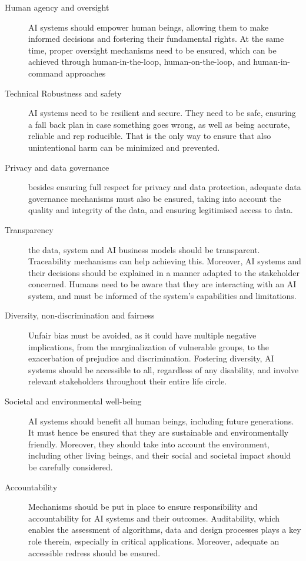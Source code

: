\begin{description}
    \item[Human agency and oversight] AI systems should empower human beings, allowing them to make informed decisions and fostering their fundamental rights. At the same time, proper oversight mechanisms need to be ensured, which can be achieved through human-in-the-loop, human-on-the-loop, and human-in-command approaches
    \item[Technical Robustness and safety] AI systems need to be resilient and secure. They need to be safe, ensuring a fall back plan in case something goes wrong, as well as being accurate, reliable and rep roducible. That is the only way to ensure that also unintentional harm can be minimized and prevented.
    \item[Privacy and data governance] besides ensuring full respect for privacy and data protection, adequate data governance mechanisms must also be ensured, taking into account the quality and integrity of the data, and ensuring legitimised access to data.
    \item[Transparency] the data, system and AI business models should be transparent. Traceability mechanisms can help achieving this. Moreover, AI systems and their decisions should be explained in a manner adapted to the stakeholder concerned. Humans need to be aware that they are interacting with an AI system, and must be informed of the system’s capabilities and limitations.
    \item[Diversity, non-discrimination and fairness] Unfair bias must be avoided, as it could have multiple negative implications, from the marginalization of vulnerable groups, to the exacerbation of prejudice and discrimination. Fostering diversity, AI systems should be accessible to all, regardless of any disability, and involve relevant stakeholders throughout their entire life circle.
    \item[Societal and environmental well-being] AI systems should benefit all human beings, including future generations. It must hence be ensured that they are sustainable and environmentally friendly. Moreover, they should take into account the environment, including other living beings, and their social and societal impact should be carefully considered. 
    \item[Accountability] Mechanisms should be put in place to ensure responsibility and accountability for AI systems and their outcomes. Auditability, which enables the assessment of algorithms, data and design processes plays a key role therein, especially in critical applications. Moreover, adequate an accessible redress should be ensured.
\end{description}


